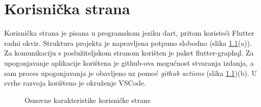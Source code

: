 \documentclass[times, utf8, zavrsni]{fer}
\begin{document}
\chapter{Korisnička strana}
Korisnička strana je pisana u programskom jeziku dart, pritom koristeći
Flutter radni okvir. Struktura projekta je napravljena potpuno slobodno (slika \ref{fig:Frontend}(a)).
Za komunikaciju s poslužiteljskom stranom korišten je paket flutter-graphql.
Za upogonjavanje aplikacije korištena je github-ova mogućnost
stvaranja izdanja, a sam proces upogonjavanja je obavljeno uz pomoć \textit{github actions} (slika \ref{fig:Frontend})(b).
U svrhe razvoja korišteno je okruženje VSCode.
\begin{figure}[h]
      \centering
      \caption{Osnovne karakteristike korisničke strane}
      \label{fig:Frontend}
\end{figure}
\end{document}
